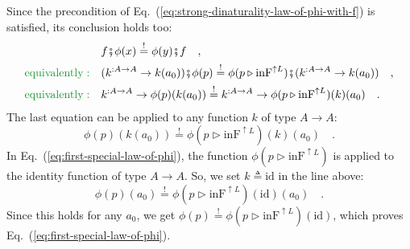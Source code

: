 Since the precondition of Eq.~(\ref{eq:strong-dinaturality-law-of-phi-with-f})
is satisfied, its conclusion holds too:
\begin{align*}
 & f\bef\phi(x)\overset{!}{=}\phi(y)\bef f\quad,\\
{\color{greenunder}\text{equivalently}:}\quad & (k^{:A\rightarrow A}\rightarrow k(a_{0}))\bef\phi(p)\overset{!}{=}\phi(p\triangleright\text{inF}^{\uparrow L})\bef(k^{:A\rightarrow A}\rightarrow k(a_{0}))\quad,\\
{\color{greenunder}\text{equivalently}:}\quad & k^{:A\rightarrow A}\rightarrow\phi(p)(k(a_{0}))\overset{!}{=}k^{:A\rightarrow A}\rightarrow\phi(p\triangleright\text{inF}^{\uparrow L})(k)(a_{0})\quad.
\end{align*}
The last equation can be applied to any function $k$ of type $A\rightarrow A$:\vspace{-0.3\baselineskip}
\[
\phi(p)(k(a_{0}))\overset{!}{=}\phi(p\triangleright\text{inF}^{\uparrow L})(k)(a_{0})\quad.
\]
In Eq.~(\ref{eq:first-special-law-of-phi}), the function $\phi(p\triangleright\text{inF}^{\uparrow L})$
is applied to the identity function of type $A\rightarrow A$. So,
we set $k\triangleq\text{id}$ in the line above:\vspace{-0.3\baselineskip}
\[
\phi(p)(a_{0})\overset{!}{=}\phi(p\triangleright\text{inF}^{\uparrow L})(\text{id})(a_{0})\quad.
\]
Since this holds for any $a_{0}$, we get $\phi(p)\overset{!}{=}\phi(p\triangleright\text{inF}^{\uparrow L})(\text{id})$,
which proves Eq.~(\ref{eq:first-special-law-of-phi}).

